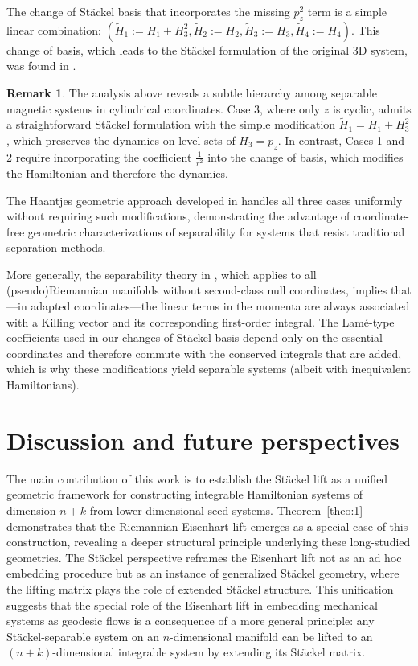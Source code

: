 \documentclass[10pt]{amsart}
\numberwithin{equation}{section}
\theoremstyle{definition}
\newtheorem{remark}{\textbf{Remark}}
\begin{document}
The change of St\"ackel basis that incorporates the missing $p_z^2$ term is a simple linear combination: $(\tilde{H}_1:=H_1+H_3^2,\tilde{H}_2:=H_2,\tilde{H}_3:=H_3,\tilde{H}_4:=H_4).$ This change of basis, which leads to the St\"ackel formulation of the original 3D system, was found in \cite{KRTT2024PRA}.



\begin{remark}
	The analysis above reveals a subtle hierarchy among separable magnetic systems in cylindrical coordinates. Case 3, where only $z$ is cyclic, admits a straightforward Stäckel formulation with the simple modification $\tilde{H}_1 = H_1 + H_3^2$, which preserves the dynamics on level sets of $H_3 = p_z$. In contrast, Cases 1 and 2 require incorporating the  coefficient $\frac{1}{r^2}$ into the change of basis, which modifies the Hamiltonian and therefore the dynamics.

The Haantjes geometric approach developed in \cite{KRTT2024PRA} handles all three cases uniformly without requiring such modifications, demonstrating the advantage of coordinate-free geometric characterizations of separability for systems that resist traditional separation methods.
	
	More generally, the separability theory in \cite{Benenti2001}, which applies to all (pseudo)Riemannian manifolds without second-class null coordinates, implies that—in adapted coordinates—the linear terms in the momenta are always associated with a Killing vector and its corresponding first-order integral. The Lamé-type coefficients used in our changes of Stäckel basis depend only on the essential coordinates and therefore commute with the conserved integrals that are added, which is why these modifications yield separable systems (albeit with inequivalent Hamiltonians).
\end{remark}



\section{Discussion and future perspectives} \label{sec:9}

The main contribution of this work is to establish the Stäckel lift as a unified geometric framework for constructing integrable Hamiltonian systems of dimension $n+k$ from lower-dimensional seed systems. Theorem~\ref{theo:1} demonstrates that the Riemannian Eisenhart lift emerges as a special case of this construction, revealing a deeper structural principle underlying these long-studied geometries. The Stäckel perspective reframes the Eisenhart lift not as an ad hoc embedding procedure but as an instance of generalized Stäckel geometry, where the lifting matrix plays the role of extended Stäckel structure. This unification suggests that the special role of the Eisenhart lift in embedding mechanical systems as geodesic flows is a consequence of a more general principle: any St\"ackel-separable system on an $n$-dimensional manifold can be lifted to an $(n+k)$-dimensional integrable system by extending its Stäckel matrix.
\end{document}
